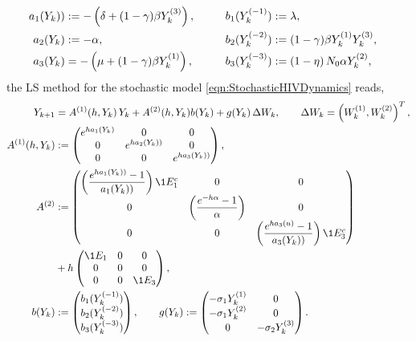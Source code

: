 \documentclass[sort&compress, preprint]{elsarticle}
\theoremstyle{definition}
\theoremstyle{plain}%
\theoremstyle{remark}
\newcommand{\SM}{LS\xspace}
\begin{document}
	
	\begin{align}
		a_{1}(Y_k)) &:= 
			-\left(
				\delta + (1 - \gamma) \beta Y_k^{(3)}
			\right),		
			& b_1(Y_k^{(-1)}) &:= \lambda, 
			& 
		\notag
		\\
		a_{2}(Y_k) &:= -\alpha,
			&b_2(Y_k^{(-2)}) & :=
			(1-\gamma) \beta Y_{k}^{(1)} Y_{k}^{(3)},
		\notag
		\\
		a_{3}(Y_k) &= 
		-
		\left(
			\mu + (1- \gamma) \beta Y_{k}^{(1)}
		\right),
		\qquad
		&b_{3}(Y_k^{(-3)}) &:= 
		\left(
			1 - \eta 
		\right)
		N_0 \alpha Y_{k}^{(2)},
		\notag			
	\end{align}
	 the \SM method for the stochastic model \eqref{eqn:StochasticHIVDynamics} reads,
	\begin{align}
		Y_{k+1} &= A^{(1)}(h,Y_k) \,Y_k + A^{(2)}(h,Y_k)b(Y_k)+ g(Y_k)\, \Delta W_k,
		\qquad \Delta W_k = \left(W_k^{(1)}, W_k^{(2)}\right)^T, 
		\notag\\ 
		A^{(1)}(h,Y_k)&:=
		\begin{pmatrix}
		e^{ha_1(Y_k)}	&	0	&0 \\
		0	&e^{ha_2(Y_k))}	&0\\
		0	&0				&e^{ha_3(Y_k))}
	\end{pmatrix},
%	
	\notag
	\\
	A^{(2)}&:=
	\begin{pmatrix}
		\left(
			\displaystyle
				\frac{e^{ha_1(Y_k))} - 1}{a_1(Y_k))}
			\right)\1{E_1^c}	&0	&0\\
			0 & 
			\left(\displaystyle
					\frac{e^{-h\alpha} - 1}{\alpha}
			\right) & 0\\
			0	&0
			&\left( 
				\displaystyle
				\frac{e^{ha_3(u)} - 1}{a_3(Y_k))}
				\right)\1{E_3^c}%
	\end{pmatrix}
	\notag \\
	&+h
	\begin{pmatrix}
		\1{E_1}	&0 			&0\\
		0		&0			&0\\
		0		&0			&\1{E_3}\\
	\end{pmatrix},
	\notag
	\\
	b(Y_k) &:=
	\begin{pmatrix}
		b_1(Y_k^{(-1)})\\
		b_2(Y_k^{(-2)})\\
		b_3(Y_k^{(-3)})
	\end{pmatrix},
	\qquad
	g(Y_k):=
	\begin{pmatrix}
		-\sigma_1 Y_k^{(1)}	&0\\
		-\sigma_1 Y_k^{(2)}	&0\\
		0	&-\sigma_2 Y_k^{(3)}
	\end{pmatrix}.
\end{align}
	
\end{document}
